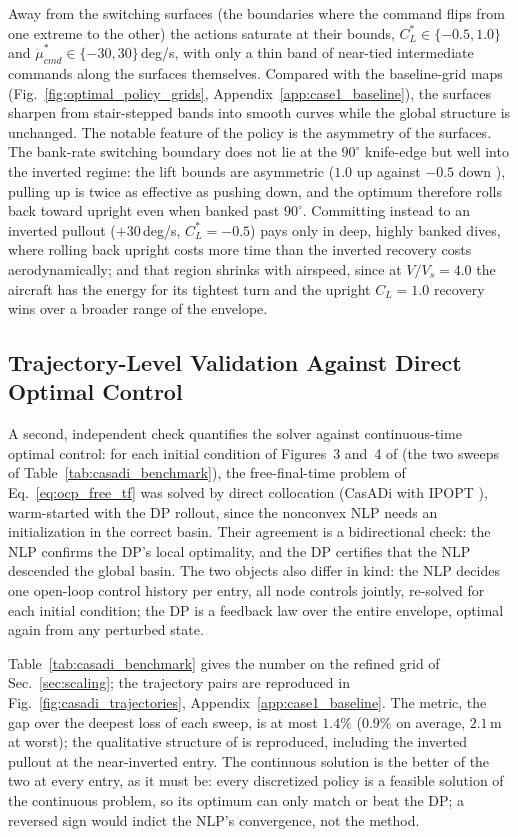 \documentclass[journal ]{new-aiaa}
\begin{document}
Away from the switching surfaces (the boundaries where the command
flips from one extreme to the other) the actions saturate at their
bounds, $C_L^* \in \{-0.5, 1.0\}$ and
$\dot{\mu}_{cmd}^* \in \{-30, 30\}$\,deg/s, with only a thin band of
near-tied intermediate commands along the surfaces themselves.
Compared with the baseline-grid maps
(Fig.~\ref{fig:optimal_policy_grids},
Appendix~\ref{app:case1_baseline}), the surfaces sharpen from
stair-stepped bands into smooth curves while the global structure is
unchanged. The notable feature of the policy is the asymmetry of the
surfaces. The bank-rate switching boundary does not lie at the
$90^\circ$ knife-edge but well into the inverted regime: the lift
bounds are asymmetric ($1.0$ up against $-0.5$ down
\cite{Bunge2018}), pulling up is twice as effective as pushing down,
and the optimum therefore rolls back toward upright even when banked
past $90^\circ$. Committing instead to an inverted pullout
($+30$\,deg/s, $C_L^* = -0.5$) pays only in deep, highly banked
dives, where rolling back upright costs more time than the inverted
recovery costs aerodynamically; and that region shrinks with
airspeed, since at $V/V_s = 4.0$ the aircraft has the energy for its
tightest turn and the upright $C_L = 1.0$ recovery wins
over a broader range of the envelope.

\subsection{Trajectory-Level Validation Against Direct Optimal Control}

A second, independent check quantifies the solver against
continuous-time optimal control: for each initial condition of
Figures~3 and~4 of \cite{Bunge2018} (the two sweeps of
Table~\ref{tab:casadi_benchmark}), the free-final-time
problem of Eq.~\eqref{eq:ocp_free_tf} was solved by direct
collocation \cite{Betts1998} (CasADi \cite{Andersson2019} with IPOPT
\cite{Wachter2006}), warm-started with the DP rollout, since the
nonconvex NLP needs an initialization in the correct basin. Their
agreement is a bidirectional check: the NLP confirms the DP's local
optimality, and the DP certifies that the NLP descended the global
basin. The two objects also differ in kind: the NLP decides one
open-loop control history per entry, all node controls jointly,
re-solved for each initial condition; the DP is a feedback law over
the entire envelope, optimal again from any perturbed state.

Table~\ref{tab:casadi_benchmark} gives the number on the refined
grid of Sec.~\ref{sec:scaling}; the trajectory pairs are reproduced
in Fig.~\ref{fig:casadi_trajectories},
Appendix~\ref{app:case1_baseline}. The metric, the gap over the
deepest loss of each sweep, is at most $1.4\%$ ($0.9\%$ on average,
$2.1$\,m at worst); the qualitative structure of \cite{Bunge2018} is
reproduced, including the inverted pullout at the near-inverted
entry. The continuous solution is the
better of the two at every entry, as it must be: every discretized
policy is a feasible solution of the continuous problem, so its
optimum can only match or beat the DP; a reversed sign would indict
the NLP's convergence, not the method.
\end{document}
